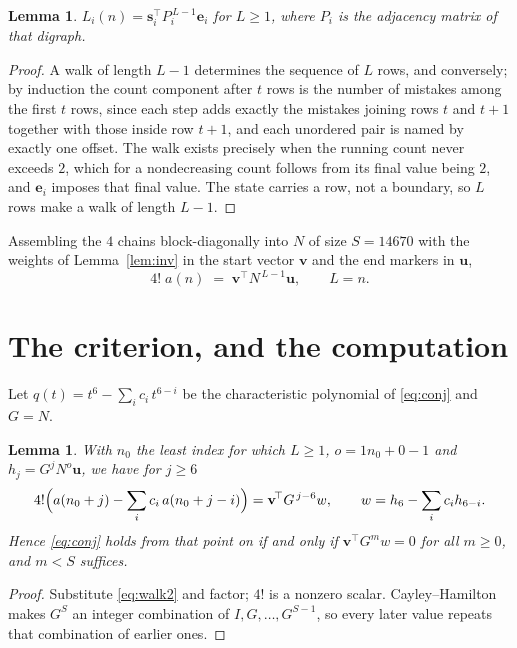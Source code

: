\documentclass[11pt,a4paper]{article}
\theoremstyle{plain}
\newtheorem{lemma}[theorem]{Lemma}
\theoremstyle{definition}
\begin{document}
\begin{lemma}\label{lem:walk}
$L_i(n)=\mathbf{s}_i^{\!\top}P_i^{\,L-1}\mathbf{e}_i$ for $L\ge1$, where $P_i$ is the
adjacency matrix of that digraph.
\end{lemma}

\begin{proof}
A walk of length $L-1$ determines the sequence of $L$ rows, and conversely; by induction
the count component after $t$ rows is the number of mistakes among the first $t$ rows,
since each step adds exactly the mistakes joining rows $t$ and $t+1$ together with those
inside row $t+1$, and each unordered pair is named by exactly one offset. The walk exists
precisely when the running count never exceeds $2$, which for a nondecreasing count follows
from its final value being $2$, and $\mathbf{e}_i$ imposes that final value. The state
carries a row, not a boundary, so $L$ rows make a walk of length $L-1$.
\end{proof}

Assembling the $4$ chains block-diagonally into $N$ of size $S=14670$ with the weights of
Lemma~\ref{lem:inv} in the start vector $\mathbf{v}$ and the end markers in
$\mathbf{u}$,
\begin{equation}\label{eq:walk2}
4!\;a(n)\;=\;\mathbf{v}^{\!\top}N^{\,L-1}\mathbf{u},\qquad L=n .
\end{equation}

\section{The criterion, and the computation}

Let $q(t)=t^{6}-\sum_i c_i\,t^{6-i}$ be the characteristic polynomial of
\eqref{eq:conj} and $G=N$.

\begin{lemma}\label{lem:crit}
With $n_0$ the least index for which $L\ge1$, $o=1n_0+0-1$ and
$h_j=G^{j}N^{o}\mathbf{u}$, we have for $j\ge6$
\[
4!\Bigl(a(n_0+j)-\sum_i c_i\,a(n_0+j-i)\Bigr)=\mathbf{v}^{\!\top}G^{\,j-6}w,
\qquad w=h_{6}-\sum_i c_ih_{6-i} .
\]
Hence \eqref{eq:conj} holds from that point on if and only if
$\mathbf{v}^{\!\top}G^{m}w=0$ for all $m\ge0$, and $m<S$ suffices.
\end{lemma}

\begin{proof}
Substitute \eqref{eq:walk2} and factor; $4!$ is a nonzero scalar. Cayley--Hamilton
makes $G^{S}$ an integer combination of $I,G,\dots,G^{S-1}$, so every later value repeats
that combination of earlier ones.
\end{proof}
\end{document}
